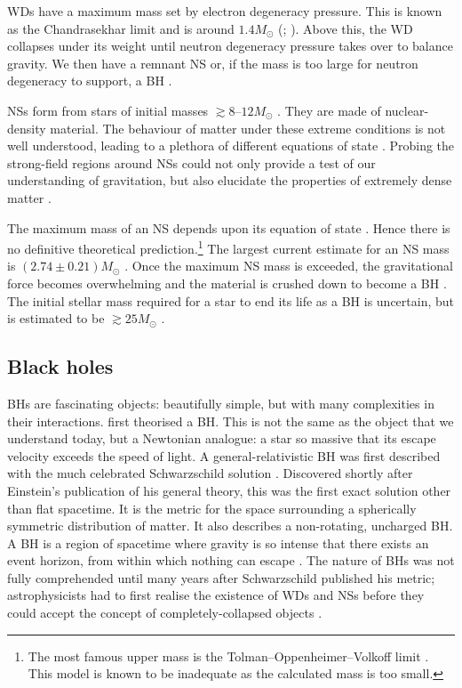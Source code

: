 WDs have a maximum mass set by electron degeneracy pressure. This is known as the Chandrasekhar limit and is around $1.4 M_\odot$ (\citealt[section 3.4]{Shapiro1983}; \citealt{Nomoto1987,Timmes1996}). %
Above this, the WD collapses under its weight until neutron degeneracy pressure takes over to balance gravity. We then have a remnant NS or, if the mass is too large for neutron degeneracy to support, a BH \citep{Woosley2002,Langer2012}.

NSs form from stars of initial masses $\gtrsim 8$--$12 M_\odot$ \citep{Woosley2002,Poelarends2008,Langer2012}. They are made of nuclear-density material. The behaviour of matter under these extreme conditions is not well understood, leading to a plethora of different equations of state \citep{Lattimer2012}. Probing the strong-field regions around NSs could not only provide a test of our understanding of gravitation, but also elucidate the properties of extremely dense matter \citep[e.g.,][]{Read2009,Ozel2009,Lackey2012}.

The maximum mass of an NS depends upon its equation of state \citep[section 9.3]{Shapiro1983}. Hence there is no definitive theoretical prediction.\footnote{The most famous upper mass is the Tolman--Oppenheimer--Volkoff limit \citep{Tolman1939,Oppenheimer1939}. This model is known to be inadequate as the calculated mass is too small.} The largest current estimate for an NS mass is $(2.74 \pm 0.21) M_\odot$ \citep{Freire2008,Ozel2012}. Once the maximum NS mass is exceeded, the gravitational force becomes overwhelming and the material is crushed down to become a BH \citep[section 12.1]{Shapiro1983}. The initial stellar mass required for a star to end its life as a BH is uncertain, but is estimated to be $\gtrsim 25 M_\odot$ \citep{Woosley2002,Tauris2011}.

\subsection{Black holes}

BHs are fascinating objects: beautifully simple, but with many complexities in their interactions. \citet{Michell1784} first theorised a BH. This is not the same as the object that we understand today, but a Newtonian analogue: a star so massive that its escape velocity exceeds the speed of light. A general-relativistic BH was first described with the much celebrated Schwarzschild solution \citep{Schwarzschild1916}. Discovered shortly after Einstein's publication of his general theory, this was the first exact solution other than flat spacetime. It is the metric for the space surrounding a spherically symmetric distribution of matter. It also describes a non-rotating, uncharged BH. A BH is a region of spacetime where gravity is so intense that there exists an event horizon, from within which nothing can escape \citep[section 33.1]{Misner1973}. The nature of BHs was not fully comprehended until many years after Schwarzschild published his metric; astrophysicists had to first realise the existence of WDs and NSs before they could accept the concept of completely-collapsed objects \citep{Israel1987}.

